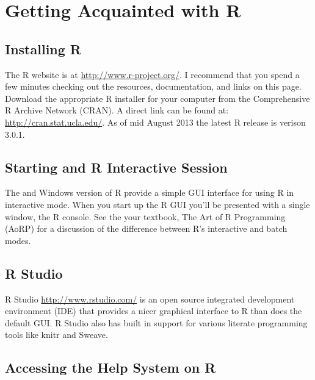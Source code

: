 \section{Getting Acquainted with R}

\subsection{Installing R}


The R website is at \url{http://www.r-project.org/}. I recommend that you spend a few minutes checking out the resources, documentation, and links on this page.   Download the appropriate R installer for your computer from the Comprehensive R Archive Network (CRAN). A direct link can be found at: \url{http://cran.stat.ucla.edu/}. As of mid August 2013 the latest R release is verison 3.0.1.



\subsection{Starting and R Interactive Session}

 The \OSX and Windows version of R provide a simple GUI
interface for using R in interactive mode. When you start up the R GUI you'll be
presented with a single window, the R console. See the your textbook, The Art of R Programming (AoRP) for a discussion of the difference between R's interactive and batch modes.

\subsection{R Studio}

R Studio \url{http://www.rstudio.com/} is an open source integrated development environment (IDE) that provides a nicer graphical interface to R than does the default GUI.  R Studio also has built in support for various literate programming tools like knitr and Sweave.

\subsection{Accessing the Help System on R}

